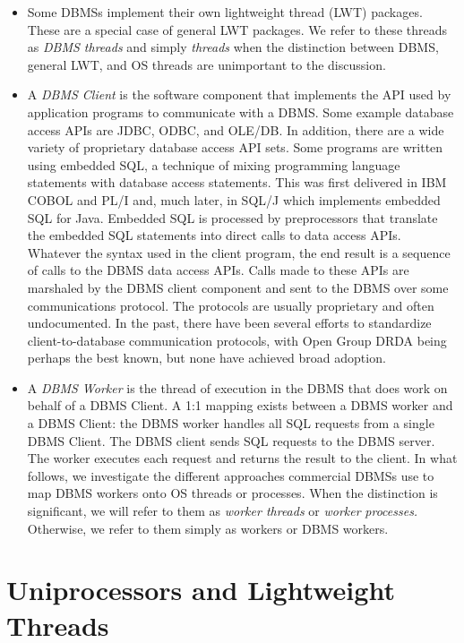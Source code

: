 \documentclass[b5paper,11pt,twoside,openright]{book}
\begin{document}
\begin{itemize}
\item
  Some DBMSs implement their own lightweight thread (LWT) packages.
  These are a special case of general LWT packages. We refer to these
  threads as \emph{DBMS threads} and simply \emph{threads} when the
  distinction between DBMS, general LWT, and OS threads are unimportant
  to the discussion.
\item
  A \emph{DBMS Client} is the software component that implements the API
  used by application programs to communicate with a DBMS. Some example
  database access APIs are JDBC, ODBC, and OLE/DB. In addition, there
  are a wide variety of proprietary database access API sets. Some
  programs are written using embedded SQL, a technique of mixing
  programming language statements with database access statements. This
  was first delivered in IBM COBOL and PL/I and, much later, in SQL/J
  which implements embedded SQL for Java. Embedded SQL is processed by
  preprocessors that translate the embedded SQL statements into direct
  calls to data access APIs. Whatever the syntax used in the client
  program, the end result is a sequence of calls to the DBMS data access
  APIs. Calls made to these APIs are marshaled by the DBMS client
  component and sent to the DBMS over some communications protocol. The
  protocols are usually proprietary and often undocumented. In the past,
  there have been several efforts to standardize client-to-database
  communication protocols, with Open Group DRDA being perhaps the best
  known, but none have achieved broad adoption.
\item
  A \emph{DBMS Worker} is the thread of execution in the DBMS that does
  work on behalf of a DBMS Client. A 1:1 mapping exists between a DBMS
  worker and a DBMS Client: the DBMS worker handles all SQL requests
  from a single DBMS Client. The DBMS client sends SQL requests to the
  DBMS server. The worker executes each request and returns the result
  to the client. In what follows, we investigate the different
  approaches commercial DBMSs use to map DBMS workers onto OS threads or
  processes. When the distinction is significant, we will refer to them
  as \emph{worker threads} or \emph{worker} \emph{processes.} Otherwise,
  we refer to them simply as workers or DBMS workers.
\end{itemize}

\hypertarget{uniprocessors-and-lightweight-threads}{%
\section{Uniprocessors and Lightweight
Threads}\label{uniprocessors-and-lightweight-threads}}
\end{document}
